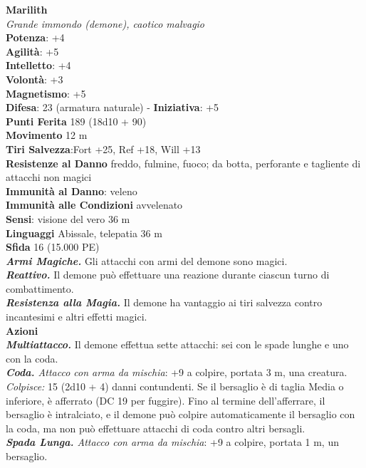 \begin{multicols}{2}
\medskip\textbf{Marilith}\\
\emph{Grande immondo (demone), caotico malvagio}\\
\textbf{Potenza}: +4\\
\textbf{Agilità}: +5\\
\textbf{Intelletto}: +4\\
\textbf{Volontà}: +3\\
\textbf{Magnetismo}: +5\\
\textbf{Difesa}: 23 (armatura naturale) - \textbf{Iniziativa}: +5\\
\textbf{Punti Ferita} 189 (18d10 + 90)\\
\textbf{Movimento} 12 m\\
\textbf{Tiri Salvezza}:Fort +25, Ref +18, Will +13\\
\textbf{Resistenze al Danno} freddo, fulmine, fuoco; da botta, perforante e tagliente di attacchi non magici\\
\textbf{Immunità al Danno}: veleno\\
\textbf{Immunità alle Condizioni} avvelenato\\
\textbf{Sensi}: visione del vero 36 m\\
\textbf{Linguaggi} Abissale, telepatia 36 m\\
\textbf{Sfida} 16 (15.000 PE)\smallskip\\
\emph{\textbf{Armi Magiche.}} Gli attacchi con armi del demone sono magici.\\
\emph{\textbf{Reattivo.}} Il demone può effettuare una reazione durante ciascun turno di combattimento.\\
\emph{\textbf{Resistenza alla Magia.}} Il demone ha vantaggio ai tiri salvezza contro incantesimi e altri effetti magici.\\
\smallskip\textbf{Azioni}\\
\emph{\textbf{Multiattacco.}} Il demone effettua sette attacchi: sei con le spade lunghe e uno con la coda.\\
\emph{\textbf{Coda.} Attacco con arma da mischia}: +9 a colpire, portata 3 m, una creatura.\\
\emph{Colpisce:} 15 (2d10 + 4) danni contundenti. Se il bersaglio è di taglia Media o inferiore, è afferrato (DC 19 per fuggire). Fino al termine dell'afferrare, il bersaglio è intralciato, e il demone può colpire automaticamente il bersaglio con la coda, ma non può effettuare attacchi di coda contro altri bersagli.\\
\emph{\textbf{Spada Lunga.} Attacco con arma da mischia}: +9 a colpire, portata 1 m, un bersaglio.\\

\end{multicols}
